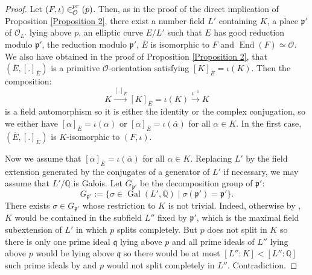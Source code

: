 \documentclass[a4paper,10pt]{report}
\theoremstyle{definition}
\theoremstyle{plain}
\theoremstyle{definition}
\newcommand{\Q}{\mathbb{Q}}
\newcommand{\mO}{\mathcal{O}}
\renewcommand{\(}{\left(}
\renewcommand{\)}{\right)}
\newcommand{\mfp}{\mathfrak{p}}
\newcommand{\mfq}{\mathfrak{q}}
\DeclareMathOperator{\End}{End}
\let\SS\relax
\DeclareMathOperator{\SS}{SS}
\DeclareMathOperator{\Gal}{Gal}
\begin{document}
\begin{proof}
Let $(F,\iota)\in\SS_\mO^{pr}(p)$.  Then, as in the proof of the direct implication of Proposition \ref{Proposition 2}, there exist a number field $L'$ containing $K$, a place $\mfp'$ of $\mO_{L'}$ lying above $p$, an elliptic curve $E/L'$ such that $E$ has good reduction modulo $\mfp'$, the reduction modulo $\mfp'$,  $\overline{E}$ is isomorphic to $F$ and $\End(F)\simeq \mO$.  We also have obtained in the proof of Proposition \ref{Proposition 2}, that $(\overline{E},[.]_{\overline{E}})$ is a primitive $\mO$-orientation satisfying $[K]_{\overline{E}}=\iota(K)$. Then the composition:
\[K\overset{[.]_{\overline{E}}}{\longrightarrow}[K]_{\overline{E}}=\iota(K)\overset{\iota^{-1}}{\longrightarrow}K\]
is a field automorphism so it is either the identity or the complex conjugation, so we either have $[\alpha]_{\overline{E}}=\iota(\alpha)$ or $[\alpha]_{\overline{E}}=\iota(\overline{\alpha})$ for all $\alpha\in K$. In the first case, $(\overline{E},[.]_{\overline{E}})$ is $K$-isomorphic to $(F,\iota)$. 

Now we assume that $[\alpha]_{\overline{E}}=\iota(\overline{\alpha})$ for all $\alpha\in K$.  Replacing $L'$ by the field extension generated by the conjugates of a generator of $L'$ if necessary, we may assume that $L'/\Q$ is Galois.  Let $G_{\mfp'}$ be the decomposition group of $\mfp'$:
\[G_{\mfp'}:=\{\sigma\in\Gal(L',\Q)\mid \sigma(\mfp')=\mfp'\}.\]
There exists $\sigma\in G_{\mfp'}$ whose restriction to $K$ is not trivial.  Indeed, otherwise by \cite[Corollary I.3]{Lang_ANT}, $K$ would be contained in the subfield $L''$ fixed by $\mfp'$, which is the maximal field subextension of $L'$ in which $p$ splits completely.  But $p$ does not split in $K$ so there is only one prime ideal $\mfq$ lying above $p$ and all prime ideals of $L''$ lying above $p$ would be lying above $\mfq$ so there would be at most $[L'':K]<[L'':\Q]$ such prime ideals by \cite[chapter I, Proposition 11]{Lang_ANT} and $p$ would not split completely in $L''$.  Contradiction.


\end{proof}
\end{document}
